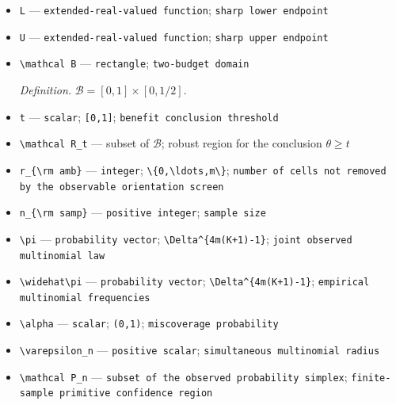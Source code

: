 \documentclass{article}
\begin{document}
\begin{itemize}
  \item \texttt{L} --- \texttt{extended-\allowbreak{}real-\allowbreak{}valued function}; \texttt{sharp lower endpoint}
  \item \texttt{U} --- \texttt{extended-\allowbreak{}real-\allowbreak{}valued function}; \texttt{sharp upper endpoint}
  \item \texttt{\textbackslash{}\allowbreak{}mathcal B} --- \texttt{rectangle}; \texttt{two-\allowbreak{}budget domain}
  \par\smallskip\noindent\emph{Definition.} \(\mathcal B=[0,1]\times[0,1/2]\).
  \item \texttt{t} --- \texttt{scalar}; \texttt{[0,\allowbreak{}1]}; \texttt{benefit conclusion threshold}
  \item \texttt{\textbackslash{}\allowbreak{}mathcal R\_\allowbreak{}t} --- subset of \(\mathcal B\); robust region for the conclusion \(\theta\ge t\)
  \item \texttt{r\_\allowbreak{}\{\textbackslash{}\allowbreak{}rm amb\}\allowbreak{}} --- \texttt{integer}; \texttt{\textbackslash{}\allowbreak{}\{0,\allowbreak{}\textbackslash{}\allowbreak{}ldots,\allowbreak{}m\textbackslash{}\allowbreak{}\}\allowbreak{}}; \texttt{number of cells not removed by the observable orientation screen}
  \item \texttt{n\_\allowbreak{}\{\textbackslash{}\allowbreak{}rm samp\}\allowbreak{}} --- \texttt{positive integer}; \texttt{sample size}
  \item \texttt{\textbackslash{}\allowbreak{}pi} --- \texttt{probability vector}; \texttt{\textbackslash{}\allowbreak{}Delta\textasciicircum{}\{4m(K+\allowbreak{}1)-\allowbreak{}1\}\allowbreak{}}; \texttt{joint observed multinomial law}
  \item \texttt{\textbackslash{}\allowbreak{}widehat\textbackslash{}\allowbreak{}pi} --- \texttt{probability vector}; \texttt{\textbackslash{}\allowbreak{}Delta\textasciicircum{}\{4m(K+\allowbreak{}1)-\allowbreak{}1\}\allowbreak{}}; \texttt{empirical multinomial frequencies}
  \item \texttt{\textbackslash{}\allowbreak{}alpha} --- \texttt{scalar}; \texttt{(0,\allowbreak{}1)}; \texttt{miscoverage probability}
  \item \texttt{\textbackslash{}\allowbreak{}varepsilon\_\allowbreak{}n} --- \texttt{positive scalar}; \texttt{simultaneous multinomial radius}
  \item \texttt{\textbackslash{}\allowbreak{}mathcal P\_\allowbreak{}n} --- \texttt{subset of the observed probability simplex}; \texttt{finite-\allowbreak{}sample primitive confidence region}

\end{itemize}
\end{document}
